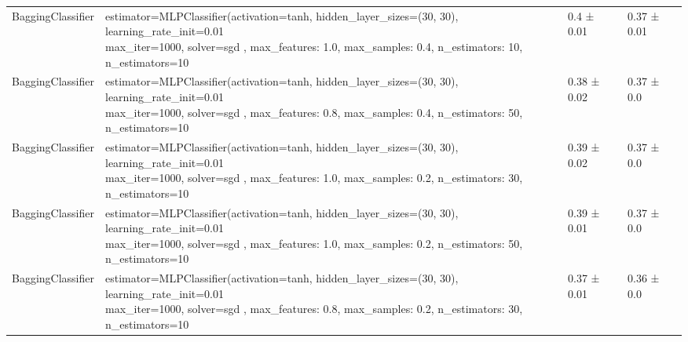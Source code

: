 \begin{tabular}{llll}
    \addlinespace[15pt]
    BaggingClassifier & \makecell[l]{estimator=MLPClassifier(activation=tanh,                                          hidden\_layer\_sizes=(30, 30),                                          learning\_rate\_init=0.01                                        \\                                         max\_iter=1000, solver=sgd , max\_features: 1.0, max\_samples: 0.4, n\_estimators: 10, n\_estimators=10} & 0.4 ± 0.01     & 0.37 ± 0.01         \\
    \addlinespace[15pt]
    BaggingClassifier & \makecell[l]{estimator=MLPClassifier(activation=tanh,                                          hidden\_layer\_sizes=(30, 30),                                          learning\_rate\_init=0.01                                        \\                                         max\_iter=1000, solver=sgd , max\_features: 0.8, max\_samples: 0.4, n\_estimators: 50, n\_estimators=10} & 0.38 ± 0.02    & 0.37 ± 0.0          \\
    \addlinespace[15pt]
    BaggingClassifier & \makecell[l]{estimator=MLPClassifier(activation=tanh,                                          hidden\_layer\_sizes=(30, 30),                                          learning\_rate\_init=0.01                                        \\                                         max\_iter=1000, solver=sgd , max\_features: 1.0, max\_samples: 0.2, n\_estimators: 30, n\_estimators=10} & 0.39 ± 0.02    & 0.37 ± 0.0          \\
    \addlinespace[15pt]
    BaggingClassifier & \makecell[l]{estimator=MLPClassifier(activation=tanh,                                          hidden\_layer\_sizes=(30, 30),                                          learning\_rate\_init=0.01                                        \\                                         max\_iter=1000, solver=sgd , max\_features: 1.0, max\_samples: 0.2, n\_estimators: 50, n\_estimators=10} & 0.39 ± 0.01    & 0.37 ± 0.0          \\
    \addlinespace[15pt]
    BaggingClassifier & \makecell[l]{estimator=MLPClassifier(activation=tanh,                                          hidden\_layer\_sizes=(30, 30),                                          learning\_rate\_init=0.01                                        \\                                         max\_iter=1000, solver=sgd , max\_features: 0.8, max\_samples: 0.2, n\_estimators: 30, n\_estimators=10} & 0.37 ± 0.01    & 0.36 ± 0.0          \\

\end{tabular}
